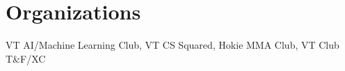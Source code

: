 \section{Organizations}
    \begin{itemize}[leftmargin=0.15in, label={}]
	\small{
		\item {VT AI/Machine Learning Club, VT CS Squared, Hokie MMA Club, VT Club T\&F/XC}}
    \end{itemize}